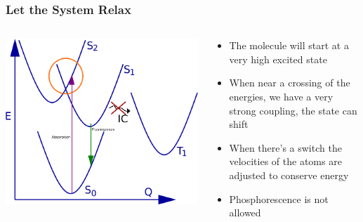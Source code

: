 \documentclass{beamer}
\begin{document}
\begin{frame}
  \frametitle{Let the System Relax}
\begin{columns}[c]
  \includegraphics[width=\textwidth]{Images/abs_chart_modified}
  \begin{block}{}
    \begin{itemize}
    \item The molecule will start at a very high excited state
    \item When near a crossing of the energies, we have a very strong coupling, the state can shift
    \item When there's a switch the velocities of the atoms are adjusted to conserve energy
    \item Phosphorescence is not allowed
    \end{itemize}
  \end{block}
\end{columns}
\end{frame}
\end{document}
